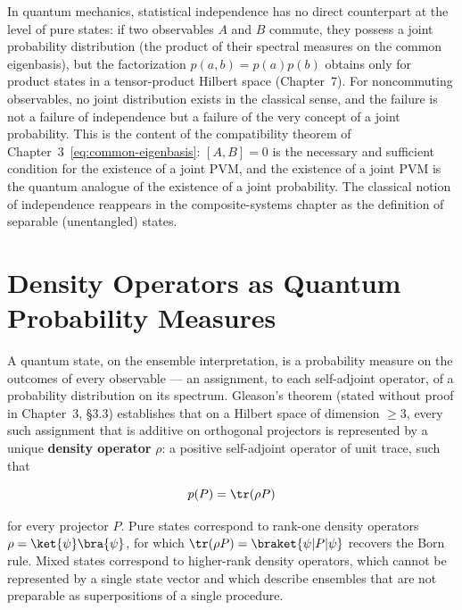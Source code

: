 In quantum mechanics, statistical independence has no direct counterpart at the level of pure states: if two observables $A$ and $B$ commute, they possess a joint probability distribution (the product of their spectral measures on the common eigenbasis), but the factorization $p(a,b) = p(a)p(b)$ obtains only for product states in a tensor-product Hilbert space (Chapter~7). For noncommuting observables, no joint distribution exists in the classical sense, and the failure is not a failure of independence but a failure of the very concept of a joint probability. This is the content of the compatibility theorem of Chapter~3~\eqref{eq:common-eigenbasis}: $[A,B] = 0$ is the necessary and sufficient condition for the existence of a joint PVM, and the existence of a joint PVM is the quantum analogue of the existence of a joint probability. The classical notion of independence reappears in the composite-systems chapter as the definition of separable (unentangled) states.

\section{Density Operators as Quantum Probability Measures}
\label{sec:density-operators}

A quantum state, on the ensemble interpretation, is a probability measure on the outcomes of every observable --- an assignment, to each self-adjoint operator, of a probability distribution on its spectrum. Gleason's theorem (stated without proof in Chapter~3, §3.3) establishes that on a Hilbert space of dimension $\ge 3$, every such assignment that is additive on orthogonal projectors is represented by a unique \textbf{density operator} $\rho$: a positive self-adjoint operator of unit trace, such that
\begin{linenomath}
    \begin{equation}
        p(P) = \tr(\rho P)
        \label{eq:density-probability}
    \end{equation}
\end{linenomath}
for every projector $P$. Pure states correspond to rank-one density operators $\rho = \ket{\psi}\bra{\psi}$, for which $\tr(\rho P) = \braket{\psi|P|\psi}$ recovers the Born rule. Mixed states correspond to higher-rank density operators, which cannot be represented by a single state vector and which describe ensembles that are not preparable as superpositions of a single procedure.

